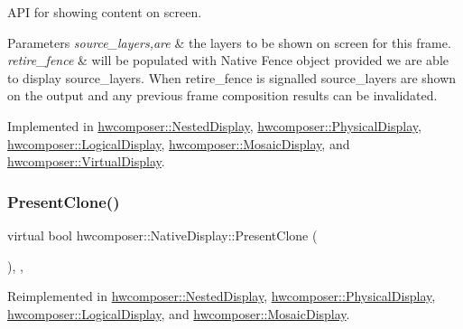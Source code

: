 A\+PI for showing content on screen. 
\begin{DoxyParams}{Parameters}
{\em source\+\_\+layers,are} & the layers to be shown on screen for this frame. \\
\hline
{\em retire\+\_\+fence} & will be populated with Native Fence object provided we are able to display source\+\_\+layers. When retire\+\_\+fence is signalled source\+\_\+layers are shown on the output and any previous frame composition results can be invalidated. \\
\hline
\end{DoxyParams}


Implemented in \mbox{\hyperlink{classhwcomposer_1_1NestedDisplay_af7983c8f6bafff1ab2077f7b3d38a0de}{hwcomposer\+::\+Nested\+Display}}, \mbox{\hyperlink{classhwcomposer_1_1PhysicalDisplay_aafc7fc562c026ce24ac7900c12023bd8}{hwcomposer\+::\+Physical\+Display}}, \mbox{\hyperlink{classhwcomposer_1_1LogicalDisplay_a2cc998518219938311c9bba35cac4935}{hwcomposer\+::\+Logical\+Display}}, \mbox{\hyperlink{classhwcomposer_1_1MosaicDisplay_a84e8ddade543bca6659a1eb7bfe72bcd}{hwcomposer\+::\+Mosaic\+Display}}, and \mbox{\hyperlink{classhwcomposer_1_1VirtualDisplay_ae97c6838a094e32117b496445e0a8c3e}{hwcomposer\+::\+Virtual\+Display}}.

\mbox{\label{classhwcomposer_1_1NativeDisplay_ae031f7f90f8a4ab3fba24a31c4cc6b74}} 
\subsubsection{\texorpdfstring{Present\+Clone()}{PresentClone()}}
{\footnotesize\ttfamily virtual bool hwcomposer\+::\+Native\+Display\+::\+Present\+Clone (\begin{DoxyParamCaption}\item[{\mbox{\hyperlink{classhwcomposer_1_1NativeDisplay}{Native\+Display}} $\ast$}]{ }\end{DoxyParamCaption})\hspace{0.3cm}{\ttfamily [inline]}, {\ttfamily [protected]}, {\ttfamily [virtual]}}



Reimplemented in \mbox{\hyperlink{classhwcomposer_1_1NestedDisplay_ae78bf526c8b23585edffc5e1d306647d}{hwcomposer\+::\+Nested\+Display}}, \mbox{\hyperlink{classhwcomposer_1_1PhysicalDisplay_a3432baaabedbb27e45ea64fcc894a344}{hwcomposer\+::\+Physical\+Display}}, \mbox{\hyperlink{classhwcomposer_1_1LogicalDisplay_acd399ec20ae92f1c68db2fbcff91f8f0}{hwcomposer\+::\+Logical\+Display}}, and \mbox{\hyperlink{classhwcomposer_1_1MosaicDisplay_a989d240e0d3287ec2b9e6cfbe1041bda}{hwcomposer\+::\+Mosaic\+Display}}.



